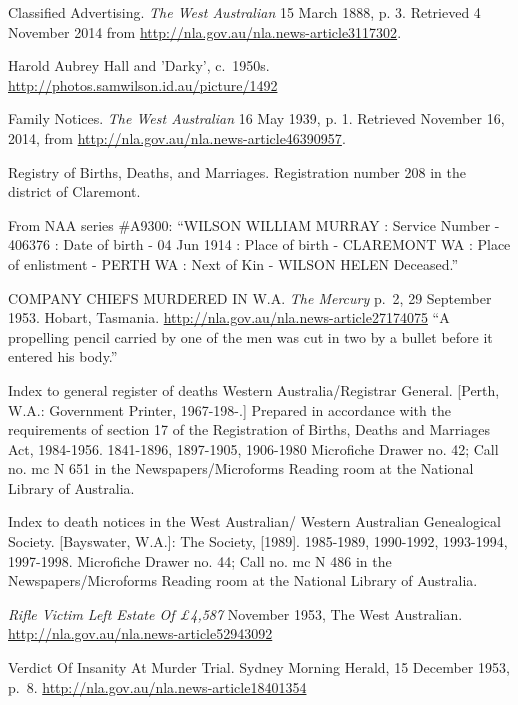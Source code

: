 \begin{thebibliography}{999}
	Classified Advertising. \emph{The West Australian} 15 March 1888, p. 3.
	Retrieved 4 November 2014 from \url{http://nla.gov.au/nla.news-article3117302}.

	Harold Aubrey Hall and 'Darky', c.\ 1950s.
	\url{http://photos.samwilson.id.au/picture/1492}

	Family Notices. \emph{The West Australian} 16 May 1939, p. 1. Retrieved November 16, 2014, from \url{http://nla.gov.au/nla.news-article46390957}.

	Registry of Births, Deaths, and Marriages. Registration number 208 in the district of Claremont.

	From NAA series \#A9300: ``WILSON WILLIAM MURRAY : Service Number - 406376
	: Date of birth - 04 Jun 1914 : Place of birth - CLAREMONT WA
	: Place of enlistment - PERTH WA : Next of Kin - WILSON HELEN Deceased.''

	 COMPANY CHIEFS MURDERED IN W.A. \emph{The Mercury} p.\ 2, 29 September 1953. Hobart, Tasmania.
	 \url{http://nla.gov.au/nla.news-article27174075}
	 ``A propelling pencil carried by one of the men was cut in two by a bullet before it entered his body.''

	Index to general register of deaths Western Australia/Registrar General. [Perth, W.A.: Government Printer, 1967-198-.] Prepared in accordance with the requirements of section 17 of the Registration of Births, Deaths and Marriages Act, 1984-1956. 1841-1896, 1897-1905, 1906-1980 Microfiche Drawer no. 42; Call no. mc N 651 in the Newspapers/Microforms Reading room at the National Library of Australia.

	Index to death notices in the West Australian/ Western Australian Genealogical Society. [Bayswater, W.A.]: The Society, [1989]. 1985-1989, 1990-1992, 1993-1994, 1997-1998. Microfiche Drawer no. 44; Call no. mc N 486 in the Newspapers/Microforms Reading room at the National Library of Australia.

	\emph{Rifle Victim Left Estate Of \pounds 4,587} November 1953, The West Australian.
	\url{http://nla.gov.au/nla.news-article52943092}

	Verdict Of Insanity At Murder Trial. Sydney Morning Herald, 15 December 1953, p.\ 8.
	\url{http://nla.gov.au/nla.news-article18401354}


\end{thebibliography}
